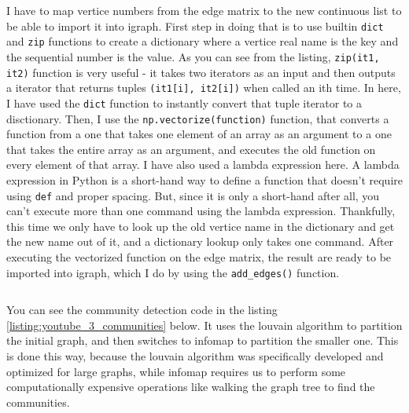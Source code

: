 \documentclass[12pt, a4paper]{article}
\begin{document}
I have to map vertice numbers from the edge matrix to the new continuous list to be able to import it into igraph. First step in doing that is to use builtin \texttt{dict} and \texttt{zip} functions to create a dictionary where a vertice real name is the key and the sequential number is the value. As you can see from the listing, \texttt{zip(it1, it2)} function is very useful - it takes two iterators as an input and then outputs a iterator that returns tuples \texttt{(it1[i], it2[i])} when called an ith time. In here, I have used the \texttt{dict} function to instantly convert that tuple iterator to a disctionary. Then, I use the \texttt{np.vectorize(function)} function, that converts a function from a one that takes one element of an array as an argument to a one that takes the entire array as an argument, and executes the old function on every element of that array. I have also used a lambda expression here. A lambda expression in Python is a short-hand way to define a function that doesn't require using \texttt{def} and proper spacing. But, since it is only a short-hand after all, you can't execute more than one command using the lambda expression. Thankfully, this time we only have to look up the old vertice name in the dictionary and get the new name out of it, and a dictionary lookup only takes one command. After executing the vectorized function on the edge matrix, the result are ready to be imported into igraph, which I do by using the \texttt{add\_edges()} function.

\bgroup
  \inputminted[linenos, breaklines=true, fontsize=\scriptsize, firstnumber=last]{python}{src/youtube/igraph_creation/2_igraph.py}
  \label{listing:youtube_2_igraph}
\egroup


You can see the community detection code in the listing \ref{listing:youtube_3_communities} below. It uses the louvain algorithm to partition the initial graph, and then switches to infomap to partition the smaller one. This is done this way, because the louvain algorithm was specifically developed and optimized for large graphs, while infomap requires us to perform some computationally expensive operations like walking the graph tree to find the communities.

\bgroup
  \inputminted[linenos, breaklines=true, fontsize=\scriptsize, firstnumber=last]{python}{src/youtube/igraph_creation/3_communities.py}
  \label{listing:youtube_3_communities}
\egroup
\end{document}
